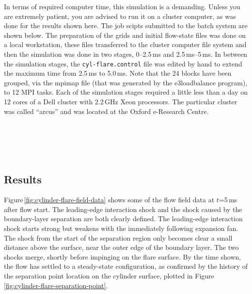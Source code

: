 \medskip
In terms of required computer time, this simulation is a demanding.
Unless you are extremely patient, you are advised to run it on a cluster computer,
as was done for the results shown here.
The job scipts submitted to the batch system are shown below.
The preparation of the grids and initial flow-state files was done on a local workstation, 
these files transferred to the cluster computer file system and 
then the simulation was done in two stages, 
0--2.5\,ms and 2.5\,ms--5\,ms.
In between the simulation stages, the \texttt{cyl-flare.control} file was edited by hand
to extend the maximum time from 2.5\,ms to 5.0\,ms.
Note that the 24 blocks have been grouped, via the mpimap file 
(that was generated by the e3loadbalance program), to 12 MPI tasks.
Each of the simulation stages required a little less than a day on 12 cores of a Dell cluster 
with 2.2\,GHz Xeon processors.
The particular cluster was called ``arcus'' and was located at the Oxford e-Research Centre.

\noindent
\topbar
{}
\bottombar\\
\topbar
{}
\bottombar\\
\topbar

\bottombar\\

\subsection{Results}
%
Figure\,\ref{fig:cylinder-flare-field-data} shows some of the flow field data at $t$=5\,ms after flow start.
The leading-edge interaction shock and the shock caused by the boundary-layer separation
are both clearly defined.
The leading-edge interaction shock starts strong but weakens with the immediately following expansion fan.
The shock from the start of the separation region only becomes clear a small distance above the surface,
near the outer edge of the boundary layer.
The two shocks merge, shortly before impinging on the flare surface.
By the time shown, the flow has settled to a steady-state configuration,
as confirmed by the history of the separation point location on the cylinder surface,
plotted in Figure\,\ref{fig:cylinder-flare-separation-point}.


